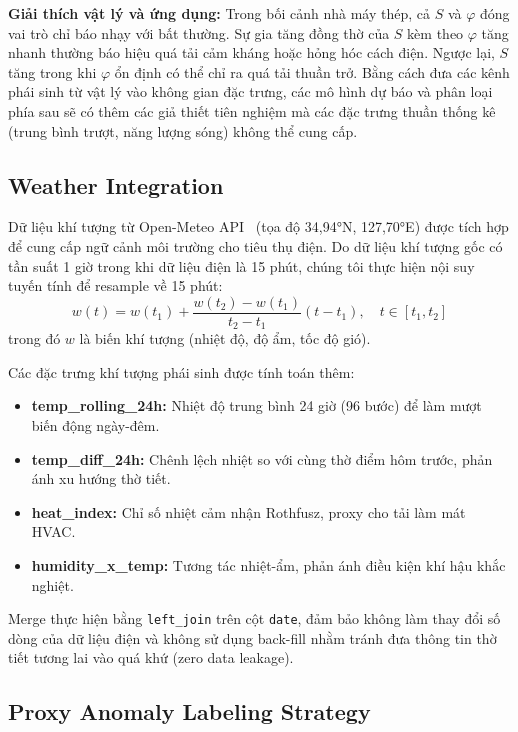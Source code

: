 \documentclass[conference]{IEEEtran}
\begin{document}
\textbf{Giải thích vật lý và ứng dụng:}
Trong bối cảnh nhà máy thép, cả $S$ và $\varphi$ đóng vai trò chỉ báo nhạy với bất thường.
Sự gia tăng đồng thờ của $S$ kèm theo $\varphi$ tăng nhanh thường báo hiệu quá tải cảm kháng hoặc hỏng hóc cách điện.
Ngược lại, $S$ tăng trong khi $\varphi$ ổn định có thể chỉ ra quá tải thuần trở.
Bằng cách đưa các kênh phái sinh từ vật lý vào không gian đặc trưng,
các mô hình dự báo và phân loại phía sau sẽ có thêm các giả thiết tiên nghiệm
mà các đặc trưng thuần thống kê (trung bình trượt, năng lượng sóng) không thể cung cấp.

\subsection{Weather Integration}

Dữ liệu khí tượng từ Open-Meteo API~\cite{openmeteo2026} (tọa độ 34,94°N, 127,70°E)
được tích hợp để cung cấp ngữ cảnh môi trường cho tiêu thụ điện.
Do dữ liệu khí tượng gốc có tần suất 1 giờ trong khi dữ liệu điện là 15 phút,
chúng tôi thực hiện nội suy tuyến tính để resample về 15 phút:
\begin{equation}
w(t) = w(t_1) + \frac{w(t_2) - w(t_1)}{t_2 - t_1}(t - t_1), \quad t \in [t_1, t_2]
\label{eq:weather_interp}
\end{equation}
trong đó $w$ là biến khí tượng (nhiệt độ, độ ẩm, tốc độ gió).

Các đặc trưng khí tượng phái sinh được tính toán thêm:
\begin{itemize}
    \item \textbf{temp\_rolling\_24h:} Nhiệt độ trung bình 24 giờ (96 bước) để làm mượt biến động ngày-đêm.
    \item \textbf{temp\_diff\_24h:} Chênh lệch nhiệt so với cùng thờ điểm hôm trước, phản ánh xu hướng thờ tiết.
    \item \textbf{heat\_index:} Chỉ số nhiệt cảm nhận Rothfusz, proxy cho tải làm mát HVAC.
    \item \textbf{humidity\_x\_temp:} Tương tác nhiệt-ẩm, phản ánh điều kiện khí hậu khắc nghiệt.
\end{itemize}

Merge thực hiện bằng \texttt{left\_join} trên cột \texttt{date},
đảm bảo không làm thay đổi số dòng của dữ liệu điện và không sử dụng back-fill
nhằm tránh đưa thông tin thờ tiết tương lai vào quá khứ (zero data leakage).

\subsection{Proxy Anomaly Labeling Strategy}
\end{document}
